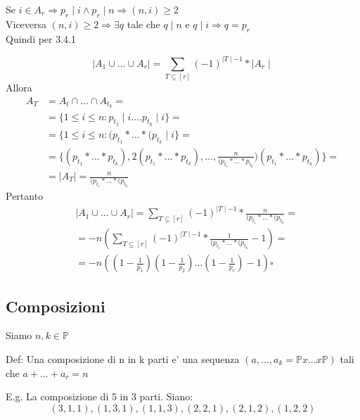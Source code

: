 \documentclass{article}
\begin{document}
        \begin{flushleft}
          Se $i \in A_r \Rightarrow p_r \mid i \land p_r \mid n \Rightarrow (n,i) \geq 2$\\ 
          Viceversa $(n,i) \geq 2 \Rightarrow \exists q$ tale che $q\mid n$ e $q \mid i \Rightarrow q=p_r$ \\ 
          Quindi per 3.4.1
        \end{flushleft}
        \begin{equation}
          \mid A_1 \cup ... \cup A_r \mid = \sum_{T \subseteq [r]} (-1)^{\mid T\mid -1}*\mid A_r \mid
        \end{equation}
        Allora
        \begin{equation}
          \begin{split}
            A_T  & = A_t \cap ... \cap A_{t_{k}} = \\ 
            & = \{ 1 \leq i \leq n: p_{t_{1}} \mid i....p_{t_{k}} \mid i \} = \\ 
            & = \{ 1 \leq i \leq n: (p_{t_{1}}*...*(p_{t_{k}}\mid i \} = \\ 
            & = \{ (p_{t_{1}}*...*p_{t_{k}}),2(p_{t_{1}}*...*p_{t_{k}}),...,\frac{n}{(p_{t_{1}}*...*p_{t_{k}}})(p_{t_{1}}*...*p_{t_{k}} )\} = \\
            & = \mid A_T \mid = \frac{n}{(p_{t_{1}}*...*(p_{t_{k}}}
          \end{split}
        \end{equation}
        Pertanto
        \begin{equation}
          \begin{split}
            & \mid A_1 \cup ... \cup A_r \mid = \sum_{T \subseteq [r]} (-1)^{\mid T \mid -1}* \frac{n}{(p_{t_{1}}*...*(p_{t_{k}}} = \\ 
            &  =-n(\sum_{T \subseteq [r]} (-1)^{\mid T \mid -1}* \frac{1}{(p_{t_{1}}*...*(p_{t_{k}}}-1) = \\ 
            & = -n((1-\frac{1}{p_1})(1-\frac{1}{p_2})...(1-\frac{1}{p_r})-1) \square
          \end{split}
        \end{equation}
        \subsection{Composizioni}
        \begin{flushleft}
          Siamo $n,k \in \mathbb{P}$
        \end{flushleft}
        \begin{flushleft}
          Def: Una composizione di n in k parti e' una sequenza $(a,...,a_k = \mathbb{P}x...x\mathbb{P})$ tali che $a+...+a_r=n$
        \end{flushleft}
        \begin{flushleft}
         E.g. La composizione di 5 in 3 parti. Siano:
          \begin{equation}
            (3,1,1),(1,3,1),(1,1,3),(2,2,1),(2,1,2),(1,2,2)
          \end{equation}
        \end{flushleft}
\end{document}
